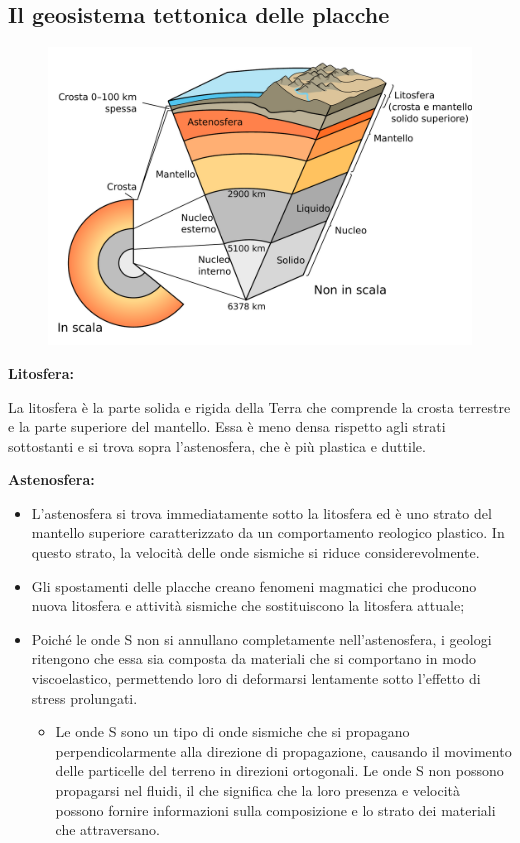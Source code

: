 \documentclass{article}
\begin{document}
\subsection{Il geosistema tettonica delle placche}
\begin{figure}[ht!]
    \begin{center}
        \includegraphics[width=.8\textwidth]{media/geo_fisica/Earth_cutaway_schematic-it.pdf}
    \end{center}
\end{figure}

\newpage
\textbf{Litosfera:}

La litosfera è la parte solida e rigida della Terra che comprende la crosta terrestre
e la parte superiore del mantello. Essa è meno densa rispetto agli strati sottostanti e
si trova sopra l'astenosfera, che è più plastica e duttile.

\textbf{Astenosfera:}
\begin{itemize}
    \item L'astenosfera si trova immediatamente sotto la litosfera ed è uno strato del mantello
        superiore caratterizzato da un comportamento reologico plastico. In questo strato, la
        velocità delle onde sismiche si riduce considerevolmente.
    \item Gli spostamenti delle placche creano fenomeni magmatici che producono nuova litosfera
        e attività sismiche che sostituiscono la litosfera attuale;
    \item Poiché le onde S non si annullano completamente nell'astenosfera, i geologi ritengono
        che essa sia composta da materiali che si comportano in modo viscoelastico, permettendo
        loro di deformarsi lentamente sotto l'effetto di stress prolungati.
        \begin{itemize}
            \item Le onde S sono un tipo di onde sismiche che si propagano perpendicolarmente
                alla direzione di propagazione, causando il movimento delle particelle del
                terreno in direzioni ortogonali. Le onde S non possono propagarsi nel fluidi,
                il che significa che la loro presenza e velocità possono fornire informazioni
                sulla composizione e lo strato dei materiali che attraversano.
        \end{itemize}
\end{itemize}
\end{document}
